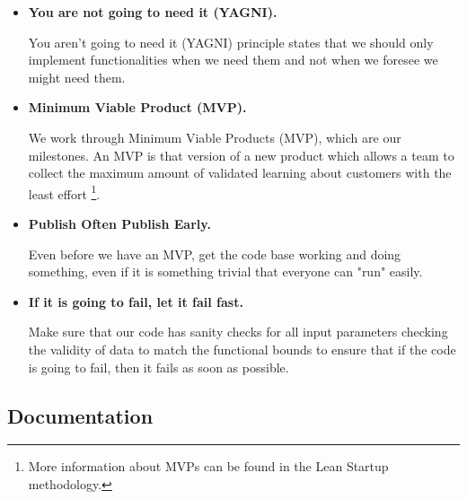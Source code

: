 \begin{itemize}
    \item \textbf{You are not going to need it (YAGNI).}
    
    \noindent
    You aren't going to need it (YAGNI) principle states that we
    should only implement functionalities when we need them and
    not when we foresee we might need them.



    \item \textbf{Minimum Viable Product (MVP).}
    
    \noindent
    We work through Minimum Viable Products (MVP), which are our
    milestones. An MVP is that version of a new product which
    allows a team to collect the maximum amount of validated
    learning about customers with the least effort
    \footnote{
        More information about MVPs can be found in the Lean
        Startup methodology.
    }.
    


    \item \textbf{Publish Often Publish Early.}
    
    \noindent
    Even before we have an MVP, get the code base working and
    doing something, even if it is something trivial that everyone
    can "run" easily.



    \item \textbf{If it is going to fail, let it fail fast.}
    
    \noindent
    Make sure that our code has sanity checks for all input
    parameters checking the validity of data to match the
    functional bounds to ensure that if the code is going to fail,
    then it fails as soon as possible.

\end{itemize}



\subsection{}














\subsection{Documentation}

